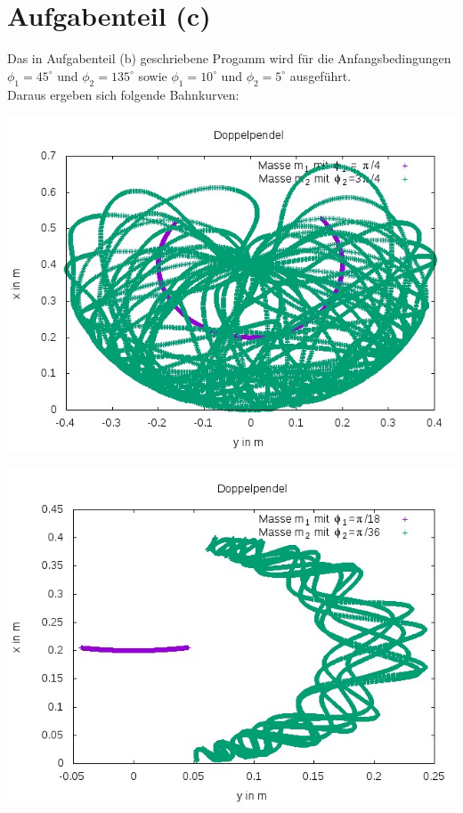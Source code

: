 \documentclass{scrreprt}
\begin{document}
\section*{Aufgabenteil (c)}
Das in Aufgabenteil (b) geschriebene Progamm wird für die Anfangsbedingungen $\phi_1 = 45^\circ$ und $\phi_2=135^\circ$ sowie $\phi_1=10^\circ$ und $\phi_2=5^\circ$ ausgeführt.\\
Daraus ergeben sich folgende Bahnkurven:
\begin{center}
	\includegraphics[scale=0.7]{1a.jpeg}
\end{center}

\begin{center}
	\includegraphics[scale=0.7]{1b.jpeg}
\end{center}
\end{document}
